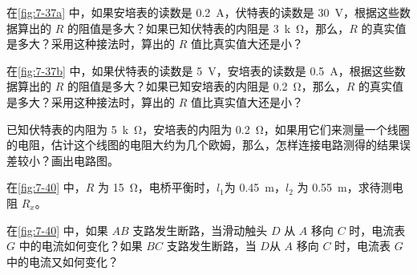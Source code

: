 \begin{Practice}
\begin{question}
  \item 在\cref{fig:7-37a} 中，如果安培表的读数是 \qty{0.2}{A}，伏特表的读数是 \qty{30}{V}，根据这些数据算出的 $R$ 的阻值是多大？如果已知伏特表的内阻是 \qty{3}{k\ohm}，那么，$R$ 的真实值是多大？采用这种接法时，算出的 $R$ 值比真实值大还是小？
  \item 在\cref{fig:7-37b} 中，如果伏特表的读数是 \qty{5}{V}，安培表的读数是 \qty{0.5}{A}，根据这些数据算出的 $R$ 的阻值是多大？如果已知安培表的内阻是 \qty{0.2}{\ohm}，那么，$R$ 的真实值是多大？采用这种接法时，算出的 $R$ 值比真实值大还是小？
  \item 已知伏特表的内阻为 \qty{5}{k\ohm}，安培表的内阻为 \qty{0.2}{\ohm}，如果用它们来测量一个线圈的电阻，估计这个线图的电阻大约为几个欧姆，那么，怎样连接电路测得的结果误差较小？画出电路图。
  \item 在\cref{fig:7-40} 中，$R$ 为 \qty{15}{\ohm}，电桥平衡时，$l_1$为 \qty{0.45}{m}，$l_2$ 为 \qty{0.55}{m}，求待测电阻 $R_x$。
  \item 在\cref{fig:7-40} 中，如果 $AB$ 支路发生断路，当滑动触头 $D$ 从 $A$ 移向 $C$ 时，电流表 $G$ 中的电流如何变化？如果 $BC$ 支路发生断路，当 $D$从 $A$ 移向 $C$ 时，电流表 $G$ 中的电流又如何变化？
\end{question}
\end{Practice}

